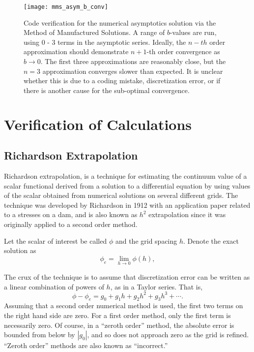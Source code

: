 \begin{figure}[H]
  \centering
  \texttt{[image: mms\_asym\_b\_conv]}
  \caption{Code verification for the numerical asymptotics solution via the Method of Manufactured Solutions. A range of $b$-values are run, using 0 - 3 terms in the asymptotic series. Ideally, the $n-th$ order approximation should demonstrate $n+1$-th order convergence as $b \to 0$. The first three approximations are reasonably close, but the $n=3$ approximation converges slower than expected. It is unclear whether this is due to a coding mistake, discretization error, or if there is another cause for the sub-optimal convergence.}
  \label{fig:mms_asym_b_conv}
\end{figure}

\section{Verification of Calculations}
\subsection{Richardson Extrapolation}
Richardson extrapolation, is a technique for estimating the continuum value of a scalar functional derived from a solution to a differential equation by using values of the scalar obtained from numerical solutions on several different grids.
The technique was developed by Richardson in 1912 with an application paper related to a stresses on a dam, and is also known as $h^2$ extrapolation since it was originally applied to a second order method.

Let the scalar of interest be called $\phi$ and the grid spacing $h$.
Denote the exact solution as
\begin{equation}
  \phi_e = \lim_{h \to 0} \phi(h),
\end{equation}

The crux of the technique is to assume that discretization error can be written as a linear combination of powers of $h$, as in a Taylor series.
That is,
\begin{equation}
  \phi - \phi_e = g_0 + g_1 h + g_2 h^2 + g_3 h^3 + \cdots.
\end{equation}
Assuming that a second order numerical method is used, the first two terms on the right hand side are zero.
For a first order method, only the first term is necessarily zero.
Of course, in a ``zeroth order'' method, the absolute error is bounded from below by $|g_0|$, and so does not approach zero as the grid is refined.
``Zeroth order'' methods are also known as ``incorrect.''

